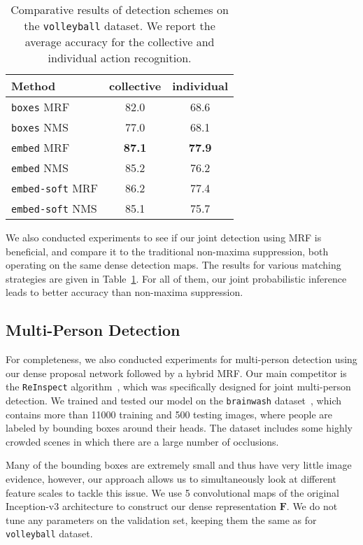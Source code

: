 \documentclass[10pt,twocolumn,letterpaper]{article}
\newcommand{\bF}[0]{\mathbf{F}}
\begin{document}
\begin{table}[ht!]
\begin{center}
\begin{tabular}{|l|c|c|}
\hline
Method                    & collective & individual  \\\hline
\texttt{boxes} MRF  & 82.0 & 68.6  \\
\texttt{boxes} NMS  & 77.0 & 68.1  \\\hline
\texttt{embed} MRF  & \textbf{87.1} & \textbf{77.9}  \\
\texttt{embed} NMS  & 85.2 & 76.2 \\\hline
\texttt{embed-soft} MRF  & 86.2 & 77.4 \\  \texttt{embed-soft} NMS  & 85.1 & 75.7 \\\hline
\end{tabular}
\end{center}
\caption{Comparative results of detection schemes on the \texttt{volleyball}
  dataset. We report the average accuracy for the collective and individual action
  recognition.}
\label{tab:eval:volley-detection}
\vspace{-0.15cm}
\end{table}


We also conducted experiments to see if our joint detection using MRF is
beneficial, and compare it to the traditional non-maxima
suppression, both operating on the same dense detection maps. The results for various
matching strategies are given in Table~\ref{tab:eval:volley-detection}. For all of them, 
our joint probabilistic inference leads to better accuracy than
non-maxima suppression.

\subsection{Multi-Person Detection}

For completeness, we also conducted experiments for multi-person detection using
our dense proposal network followed by a hybrid MRF. Our main competitor is the
 \texttt{ReInspect} algorithm~\cite{Stewart2016}, which was specifically designed for
 joint multi-person detection. We trained and tested our model on the \texttt{brainwash}
dataset~\cite{Stewart2016}, which contains more than 11000 training and 500 testing
images, where people are labeled by bounding boxes around their heads. 
The dataset includes some highly crowded scenes in which there are a large
number of occlusions.

Many of the bounding boxes are extremely small and thus have very little image
evidence, however, our approach allows us to simultaneously look at different
feature scales to tackle this issue. We use 5 convolutional
maps of the original Inception-v3 architecture to construct our dense
representation $\bF$. We do not tune any parameters on the validation set,
keeping them the same as for \texttt{volleyball} dataset. 
\end{document}
